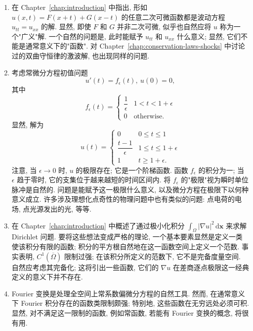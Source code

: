 \begin{enumerate}
\item 在 Chapter~\ref{chap:introduction} 中指出, 形如 $u(x,t)=F(x+t)+G(x-t)$ 的任意二次可微函数都是波动方程 $u_{tt}=u_{xx}$ 的解. 显然, 即使 $F$ 和 $G$ 并非二次可微, 似乎也自然应将 $u$ 称为一个"广义"解. 一个自然的问题是, 此时能赋予 $u_{tt}$ 和 $u_{xx}$ 什么意义; 显然, 它们不能是通常意义下的"函数". 对 Chapter~\ref{chap:conservation-laws-shocks} 中讨论过的双曲守恒律的激波解, 也出现同样的问题.
\item 考虑常微分方程初值问题
\begin{equation}\label{eq:impulse-ode-initial-value-problem}
u'(t)=f_\epsilon(t),\ u(0)=0,
\end{equation}
其中
\begin{equation}\label{eq:unit-impulse-approximating-pulse}
f_\epsilon(t)=\begin{cases}\dfrac1\epsilon&1<t<1+\epsilon\\0&\text{otherwise.}\end{cases}
\end{equation}
显然, 解为
\begin{equation}\label{eq:impulse-ode-piecewise-solution}
u(t)=\begin{cases}0&0\leq t\leq1\\\dfrac{t-1}{\epsilon}&1\leq t\leq1+\epsilon\\1&t\geq1+\epsilon.\end{cases}
\end{equation}
注意, 当 $\epsilon\to0$ 时, $u$ 的极限存在; 它是一个阶梯函数. 函数 $f_\epsilon$ 的积分为一; 当 $\epsilon$ 趋于零时, 它的支集位于越来越短的时间区间内. 将 $f_\epsilon$ 的"极限"视为瞬时单位脉冲是自然的. 问题是能赋予这一极限什么意义, 以及微分方程在极限下以何种意义成立. 许多涉及理想化点奇性的物理问题中也有类似的问题: 点电荷的电场, 点光源发出的光, 等等.
\item 在 Chapter~\ref{chap:introduction} 中概述了通过极小化积分 $\int_\Omega|\nabla u|^2\,\mathrm{d}\bm{x}$ 来求解 Dirichlet 问题. 要将这些想法变成严格的理论, 一个基本要素显然是定义一类使该积分有限的函数; 积分的平方根自然地在这一函数空间上定义一个范数. 事实表明, $C^1(\overline\Omega)$ 限制过强; 在该积分所定义的范数下, 它不是完备度量空间. 自然应考虑其完备化; 这将引出一些函数, 它们的 $\nabla u$ 在差商逐点极限这一经典定义的意义下并不存在.
\item Fourier 变换是处理全空间上常系数偏微分方程的自然工具. 然而, 在通常意义下 Fourier 积分存在的函数类限制颇强; 特别地, 这些函数在无穷远处必须可积. 显然, 对不满足这一限制的函数, 例如常函数, 若能有 Fourier 变换的概念, 将很有用.
\end{enumerate}

